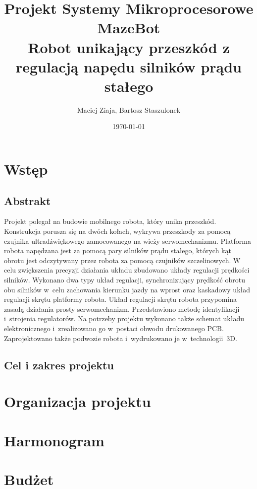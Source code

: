 \documentclass{article}
\author{Maciej Ziaja, Bartosz Staszulonek}
\date{\today}
\begin{document}
\title{
  Projekt Systemy Mikroprocesorowe \\
  \large MazeBot \\
    Robot unikający przeszkód z regulacją napędu silników prądu stałego}

\maketitle
\tableofcontents
\newpage

\section{Wstęp}

\subsection{Abstrakt}
Projekt polegał na budowie mobilnego robota, który unika przeszkód.
Konstrukcja porusza się na dwóch kołach, wykrywa przeszkody za pomocą czujnika ultradźwiękowego zamocowanego na wieży serwomechanizmu.
Platforma robota napędzana jest za pomocą pary silników prądu stałego, których kąt obrotu jest odczytywany przez robota za pomocą czujników szczelinowych.
W celu zwiększenia precyzji działania układu zbudowano układy regulacji prędkości silników.
Wykonano dwa typy układ regulacji, synchronizujący prędkość obrotu obu silników w~celu zachowania kierunku jazdy na wprost oraz kaskadowy układ regulacji skrętu platformy robota.
Układ regulacji skrętu robota przypomina zasadą działania prosty serwomechanizm.
Przedstawiono metodę identyfikacji i~strojenia regulatorów.
Na potrzeby projektu wykonano także schemat układu elektronicznego i~zrealizowano go w~postaci obwodu drukowanego PCB.
Zaprojektowano także podwozie robota i~wydrukowano je w~technologii~3D.

\subsection{Cel i zakres projektu}
\section{Organizacja projektu}
\section{Harmonogram}
\section{Budżet}
\end{document}
